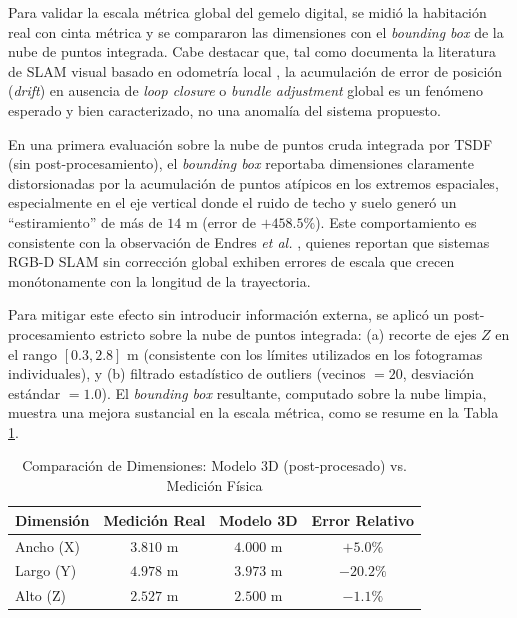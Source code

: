 \documentclass[12pt, a4, twoside, openany]{report}
\begin{document}
Para validar la escala métrica global del gemelo digital, se midió la habitación real con cinta métrica y se compararon las dimensiones con el \textit{bounding box} de la nube de puntos integrada. Cabe destacar que, tal como documenta la literatura de SLAM visual basado en odometría local \cite{sahili2023survey,6594910}, la acumulación de error de posición (\textit{drift}) en ausencia de \textit{loop closure} o \textit{bundle adjustment} global es un fenómeno esperado y bien caracterizado, no una anomalía del sistema propuesto.

En una primera evaluación sobre la nube de puntos cruda integrada por TSDF (sin post-procesamiento), el \textit{bounding box} reportaba dimensiones claramente distorsionadas por la acumulación de puntos atípicos en los extremos espaciales, especialmente en el eje vertical donde el ruido de techo y suelo generó un ``estiramiento'' de más de $14$ m (error de $+458.5\%$). Este comportamiento es consistente con la observación de Endres \textit{et al.} \cite{6594910}, quienes reportan que sistemas RGB-D SLAM sin corrección global exhiben errores de escala que crecen monótonamente con la longitud de la trayectoria.

Para mitigar este efecto sin introducir información externa, se aplicó un post-procesamiento estricto sobre la nube de puntos integrada: (a) recorte de ejes $Z$ en el rango $[0.3, 2.8]$ m (consistente con los límites utilizados en los fotogramas individuales), y (b) filtrado estadístico de outliers (vecinos $= 20$, desviación estándar $= 1.0$). El \textit{bounding box} resultante, computado sobre la nube limpia, muestra una mejora sustancial en la escala métrica, como se resume en la Tabla \ref{tab:comparacion_dimensiones}.

\begin{table}[H]
\centering
\caption{Comparación de Dimensiones: Modelo 3D (post-procesado) vs. Medición Física}
\label{tab:comparacion_dimensiones}
\begin{tabular}{lccc}
\toprule
\textbf{Dimensión} & \textbf{Medición Real} & \textbf{Modelo 3D} & \textbf{Error Relativo} \\
\midrule
Ancho (X) & $3.810$ m & $4.000$ m & $+5.0\%$ \\
Largo (Y) & $4.978$ m & $3.973$ m & $-20.2\%$ \\
Alto (Z) & $2.527$ m & $2.500$ m & $-1.1\%$ \\
\bottomrule
\end{tabular}
\end{table}
\end{document}
